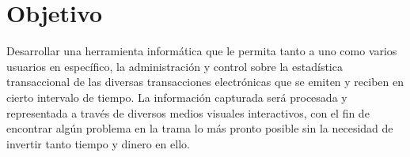\section{Objetivo}
Desarrollar una herramienta informática que le permita tanto a uno como varios usuarios en específico, la administración y control sobre la estadística transaccional de las diversas transacciones electrónicas que se emiten y reciben en cierto intervalo de tiempo. La información capturada será procesada y representada a través de diversos medios visuales interactivos, con el fin de encontrar algún problema en la trama lo más pronto posible sin la necesidad de invertir tanto tiempo y dinero en ello.